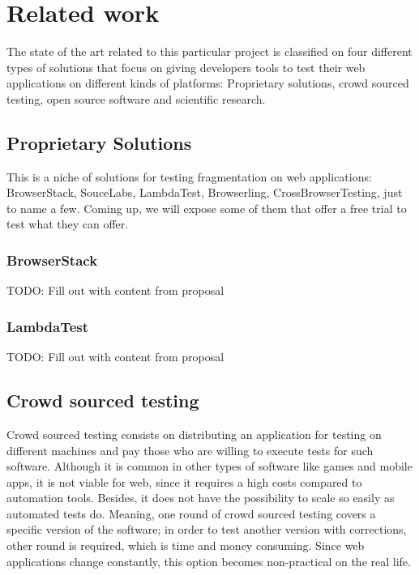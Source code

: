
\chapter{Related work} %


\label{ChapterX} %

The state of the art related to this particular project is classified on four different types of solutions that focus on giving developers tools to test their web applications on different kinds of platforms: Proprietary solutions, crowd sourced testing, open source software and scientific research.


\section{Proprietary Solutions}

This is a niche of solutions for testing fragmentation on web applications: BrowserStack, SouceLabs, LambdaTest, Browserling, CrossBrowserTesting, just to name a few. Coming up, we will expose some of them that offer a free trial to test what they can offer.

\subsection{BrowserStack}
TODO: Fill out with content from proposal

\subsection{LambdaTest}
TODO: Fill out with content from proposal

\section{Crowd sourced testing}
Crowd sourced testing consists on distributing an application for testing on different machines and pay those who are willing to execute tests for such software. Although it is common in other types of software like games and mobile apps, it is not viable for web, since it requires a high costs compared to automation tools. 
Besides, it does not have the possibility to scale so easily as automated tests do. Meaning, one round of crowd sourced testing covers a specific version of the software; in order to test another version with corrections, other round is required, which is time and money consuming. Since web applications change constantly, this option becomes non-practical on the real life. 

